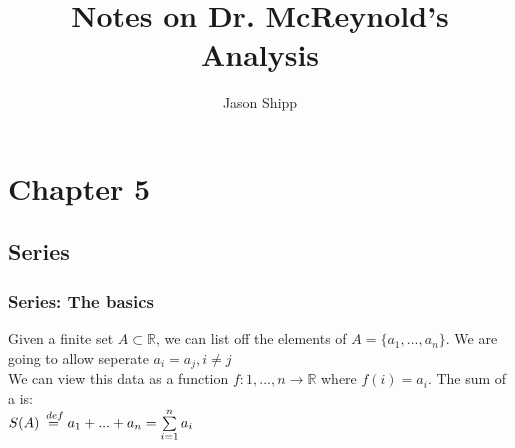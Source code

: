 \documentclass{article}
\newcommand\tab[1][1cm]{\hspace*{#1}}
\newcommand*\Def{\ensuremath{\overset{\kern2pt def}{=}}}
\begin{document}
\title{Notes on Dr. McReynold's Analysis}
\author{Jason Shipp}
\maketitle
\section*{Chapter 5}
\subsection*{Series}
\subsubsection*{Series: The basics}
Given a finite set \(A \subset \mathbb{R}\), we can list off the
elements of \(A = \{a_{1},...,a_{n}\}\). We are going to allow
seperate \(a_{i} = a_{j}, i \ne j\)\\
We can view this data as a function 
\(f: {1, ..., n} \to \mathbb{R}\) where \(f(i) = a_{i}\).
The sum of a is:\\
\tab[4cm]   \(S(A) \Def a_{1} + ... + a_{n} = 
            \sum\limits_{i=1}^{n}a_{i}\)\\
\end{document}
